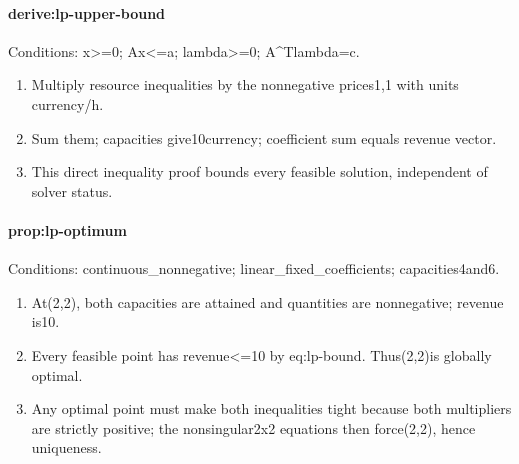 \paragraph{derive:lp-upper-bound}
Conditions: x>=0; Ax<=a; lambda>=0; A^Tlambda=c.
\begin{enumerate}
\item Multiply resource inequalities by the nonnegative prices1,1 with units currency/h.
\item Sum them; capacities give10currency; coefficient sum equals revenue vector.
\item This direct inequality proof bounds every feasible solution, independent of solver status.
\end{enumerate}
\paragraph{prop:lp-optimum}
Conditions: continuous\_nonnegative; linear\_fixed\_coefficients; capacities4and6.
\begin{enumerate}
\item At(2,2), both capacities are attained and quantities are nonnegative; revenue is10.
\item Every feasible point has revenue<=10 by eq:lp-bound. Thus(2,2)is globally optimal.
\item Any optimal point must make both inequalities tight because both multipliers are strictly positive; the nonsingular2x2 equations then force(2,2), hence uniqueness.
\end{enumerate}
